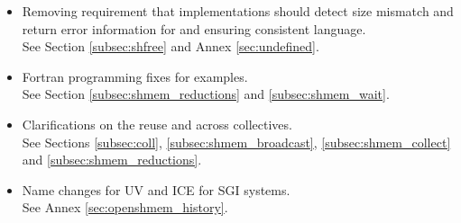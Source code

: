 \begin{itemize}
\item Removing requirement that implementations should detect size mismatch and return error information for  and ensuring consistent language.\\See Section \ref{subsec:shfree} and Annex \ref{sec:undefined}. 
\item Fortran programming fixes for examples.\\ See Section \ref{subsec:shmem_reductions} and \ref{subsec:shmem_wait}. 
\item Clarifications on the reuse  and  across collectives.\\See Sections \ref{subsec:coll}, \ref{subsec:shmem_broadcast}, \ref{subsec:shmem_collect} and \ref{subsec:shmem_reductions}.
\item Name changes for UV and ICE for SGI systems.\\See Annex \ref{sec:openshmem_history}. 
\end{itemize}
